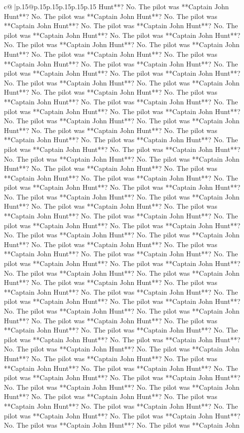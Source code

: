 \documentclass{article}
\begin{document}
{\begin{supertabular}{c@{$\;$}|p{.15\linewidth}@{}p{.15\linewidth}p{.15\linewidth}p{.15\linewidth}p{.15\linewidth}p{.15\linewidth}}
{{{Hunt**? No. The pilot was **Captain John Hunt**? No. The pilot was **Captain John Hunt**? No. The pilot was **Captain John Hunt**? No. The pilot was **Captain John Hunt**? No. The pilot was **Captain John Hunt**? No. The pilot was **Captain John Hunt**? No. The pilot was **Captain John Hunt**? No. The pilot was **Captain John Hunt**? No. The pilot was **Captain John Hunt**? No. The pilot was **Captain John Hunt**? No. The pilot was **Captain John Hunt**? No. The pilot was **Captain John Hunt**? No. The pilot was **Captain John Hunt**? No. The pilot was **Captain John Hunt**? No. The pilot was **Captain John Hunt**? No. The pilot was **Captain John Hunt**? No. The pilot was **Captain John Hunt**? No. The pilot was **Captain John Hunt**? No. The pilot was **Captain John Hunt**? No. The pilot was **Captain John Hunt**? No. The pilot was **Captain John Hunt**? No. The pilot was **Captain John Hunt**? No. The pilot was **Captain John Hunt**? No. The pilot was **Captain John Hunt**? No. The pilot was **Captain John Hunt**? No. The pilot was **Captain John Hunt**? No. The pilot was **Captain John Hunt**? No. The pilot was **Captain John Hunt**? No. The pilot was **Captain John Hunt**? No. The pilot was **Captain John Hunt**? No. The pilot was **Captain John Hunt**? No. The pilot was **Captain John Hunt**? No. The pilot was **Captain John Hunt**? No. The pilot was **Captain John Hunt**? No. The pilot was **Captain John Hunt**? No. The pilot was **Captain John Hunt**? No. The pilot was **Captain John Hunt**? No. The pilot was **Captain John Hunt**? No. The pilot was **Captain John Hunt**? No. The pilot was **Captain John Hunt**? No. The pilot was **Captain John Hunt**? No. The pilot was **Captain John Hunt**? No. The pilot was **Captain John Hunt**? No. The pilot was **Captain John Hunt**? No. The pilot was **Captain John Hunt**? No. The pilot was **Captain John Hunt**? No. The pilot was **Captain John Hunt**? No. The pilot was **Captain John Hunt**? No. The pilot was **Captain John Hunt**? No. The pilot was **Captain John Hunt**? No. The pilot was **Captain John Hunt**? No. The pilot was **Captain John Hunt**? No. The pilot was **Captain John Hunt**? No. The pilot was **Captain John Hunt**? No. The pilot was **Captain John Hunt**? No. The pilot was **Captain John Hunt**? No. The pilot was **Captain John Hunt**? No. The pilot was **Captain John Hunt**? No. The pilot was **Captain John Hunt**? No. The pilot was **Captain John Hunt**? No. The pilot was **Captain John Hunt**? No. The pilot was **Captain John Hunt**? No. The pilot was **Captain John Hunt**? No. The pilot was **Captain John Hunt**? No. The pilot was **Captain John Hunt**? No. The pilot was **Captain John Hunt**? No. The pilot was **Captain John Hunt**? No. The pilot was **Captain John Hunt**? No. The pilot was **Captain John Hunt**? No. The pilot was **Captain John Hunt**? No. The pilot was **Captain John Hunt**? No. The pilot was **Captain John Hunt**? No. The pilot was **Captain John Hunt**? No. The pilot was **Captain John Hunt**? No. The pilot was **Captain John Hunt**? No. The pilot was **Captain John Hunt**? No. The pilot was **Captain John Hunt**? No. The pilot was **Captain John }}}
\end{supertabular}}
\end{document}
